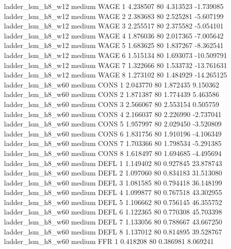   ladder_lsm_h8_w12     medium     WAGE                 1  4.238507 80       4.313523          -1.739085
  ladder_lsm_h8_w12     medium     WAGE                 2  2.383683 80       2.525281          -5.607199
  ladder_lsm_h8_w12     medium     WAGE                 3  2.255517 80       2.375582          -5.054101
  ladder_lsm_h8_w12     medium     WAGE                 4  1.876036 80       2.017365          -7.005642
  ladder_lsm_h8_w12     medium     WAGE                 5  1.683625 80       1.837267          -8.362541
  ladder_lsm_h8_w12     medium     WAGE                 6  1.515134 80       1.693073         -10.509791
  ladder_lsm_h8_w12     medium     WAGE                 7  1.322666 80       1.533732         -13.761631
  ladder_lsm_h8_w12     medium     WAGE                 8  1.273102 80       1.484929         -14.265125
  ladder_lsm_h8_w60     medium     CONS                 1  2.043770 80       1.872435           9.150362
  ladder_lsm_h8_w60     medium     CONS                 2  1.871387 80       1.774439           5.463586
  ladder_lsm_h8_w60     medium     CONS                 3  2.566067 80       2.553154           0.505759
  ladder_lsm_h8_w60     medium     CONS                 4  2.166037 80       2.226990          -2.737041
  ladder_lsm_h8_w60     medium     CONS                 5  1.957997 80       2.029450          -3.520809
  ladder_lsm_h8_w60     medium     CONS                 6  1.831756 80       1.910196          -4.106349
  ladder_lsm_h8_w60     medium     CONS                 7  1.703366 80       1.798534          -5.291385
  ladder_lsm_h8_w60     medium     CONS                 8  1.618497 80       1.694685          -4.495694
  ladder_lsm_h8_w60     medium     DEFL                 1  1.149402 80       0.927845          23.878743
  ladder_lsm_h8_w60     medium     DEFL                 2  1.097060 80       0.834183          31.513080
  ladder_lsm_h8_w60     medium     DEFL                 3  1.081585 80       0.794418          36.148199
  ladder_lsm_h8_w60     medium     DEFL                 4  1.099877 80       0.767518          43.302955
  ladder_lsm_h8_w60     medium     DEFL                 5  1.106662 80       0.756145          46.355752
  ladder_lsm_h8_w60     medium     DEFL                 6  1.122365 80       0.770308          45.703398
  ladder_lsm_h8_w60     medium     DEFL                 7  1.133056 80       0.788667          43.667250
  ladder_lsm_h8_w60     medium     DEFL                 8  1.137012 80       0.814895          39.528767
  ladder_lsm_h8_w60     medium      FFR                 1  0.418208 80       0.386981           8.069241
